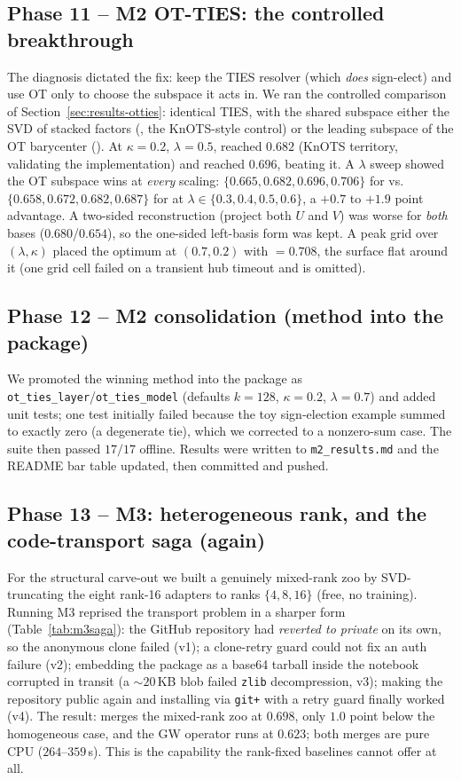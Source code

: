 \subsection{Phase 11 -- M2 OT-TIES: the controlled breakthrough}
\label{app:m2ties}
The diagnosis dictated the fix: keep the TIES resolver (which \emph{does} sign-elect) and use OT only to
choose the subspace it acts in. We ran the controlled comparison of Section~\ref{sec:results-otties}:
identical TIES, with the shared subspace either the SVD of stacked factors (\svdties{}, the KnOTS-style
control) or the leading subspace of the OT barycenter (\otties{}). At $\kappa=0.2$, $\lambda=0.5$,
\svdties{} reached $0.682$ (KnOTS territory, validating the implementation) and \otties{} reached $0.696$,
beating it. A $\lambda$ sweep showed the OT subspace wins at \emph{every} scaling: $\{0.665, 0.682,
0.696, 0.706\}$ for \otties{} vs.\ $\{0.658, 0.672, 0.682, 0.687\}$ for \svdties{} at
$\lambda\in\{0.3,0.4,0.5,0.6\}$, a $+0.7$ to $+1.9$ point advantage. A two-sided reconstruction (project
both $U$ and $V$) was worse for \emph{both} bases ($0.680$/$0.654$), so the one-sided left-basis form was
kept. A peak grid over $(\lambda,\kappa)$ placed the optimum at $(0.7, 0.2)$ with \otties{}$=0.708$, the
surface flat around it (one grid cell failed on a transient hub timeout and is omitted).

\subsection{Phase 12 -- M2 consolidation (method into the package)}
We promoted the winning method into the package as \texttt{ot\_ties\_layer}/\texttt{ot\_ties\_model}
(defaults $k{=}128$, $\kappa{=}0.2$, $\lambda{=}0.7$) and added unit tests; one test initially failed
because the toy sign-election example summed to exactly zero (a degenerate tie), which we corrected to a
nonzero-sum case. The suite then passed $17/17$ offline. Results were written to \texttt{m2\_results.md}
and the README bar table updated, then committed and pushed.

\subsection{Phase 13 -- M3: heterogeneous rank, and the code-transport saga (again)}
\label{app:m3saga}
For the structural carve-out we built a genuinely mixed-rank zoo by SVD-truncating the eight rank-16
adapters to ranks $\{4,8,16\}$ (free, no training). Running M3 reprised the transport problem in a sharper
form (Table~\ref{tab:m3saga}): the GitHub repository had \emph{reverted to private} on its own, so the
anonymous clone failed (v1); a clone-retry guard could not fix an auth failure (v2); embedding the package
as a base64 tarball inside the notebook corrupted in transit (a $\sim\!20$\,KB blob failed
\texttt{zlib} decompression, v3); making the repository public again and installing via \texttt{git+} with
a retry guard finally worked (v4). The result: \otties{} merges the mixed-rank zoo at $0.698$, only $1.0$
point below the homogeneous case, and the GW operator runs at $0.623$; both merges are pure CPU
($264$--$359$\,s). This is the capability the rank-fixed baselines cannot offer at all.

